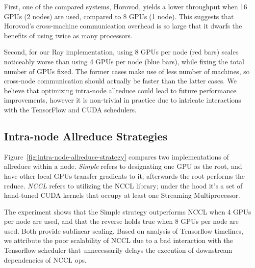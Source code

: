 First, one of the compared systems, Horovod, yields a lower throughput when 16
GPUs (2 nodes) are used, compared to 8 GPUs (1 node).  This suggests that
Horovod's cross-machine communication overhead is so large that it dwarfs the
benefits of using twice as many processors.

Second, for our Ray implementation, using 8 GPUs per node (red bars) scales
noticeably worse than using 4 GPUs per node (blue bars), while fixing the total
number of GPUs fixed.  The former cases make use of less number of machines, so
cross-node communication should actually be faster than the latter cases.  We
believe that optimizing intra-node allreduce could lead to future performance improvements,
however it is non-trivial in practice due to intricate interactions with the TensorFlow
and CUDA schedulers.

\subsection{Intra-node Allreduce Strategies}
Figure~\ref{fig:intra-node-allreduce-strategy} compares two implementations of
allreduce within a node.  \emph{Simple} refers to designating one GPU as the
root, and have other local GPUs transfer gradients to it; afterwards the root
performs the reduce.  \emph{NCCL} refers to utilizing the NCCL library; under
the hood it's a set of hand-tuned CUDA kernels that occupy at least one
Streaming Multiprocessor.

The experiment shows that the Simple strategy outperforms NCCL when 4 GPUs per
node are used, and that the reverse holds true when 8 GPUs per node are
used. Both provide sublinear scaling. Based on analysis of Tensorflow timelines, 
we attribute the poor scalability of NCCL due to a bad interaction with the
Tensorflow scheduler that unnecessarily delays
the execution of downstream dependencies of NCCL ops.


